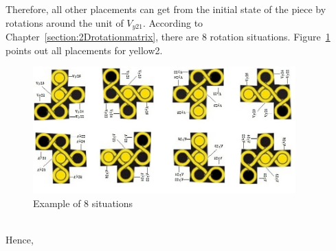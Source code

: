 Therefore, all other placements can get from the initial state of the piece by rotations around the unit of $V_{y21}$. According to Chapter~\ref{section:2Drotationmatrix}, there are 8 rotation situations. Figure~\ref{fig:Exampleof8} points out all placements for yellow2.
\begin{figure}[htbp]
\centering
\includegraphics[width =0.9\textwidth]{figs/domainexplain.jpg}
    \caption{Example of 8 situations}
    \label{fig:Exampleof8}
\end{figure}
\\Hence, 
